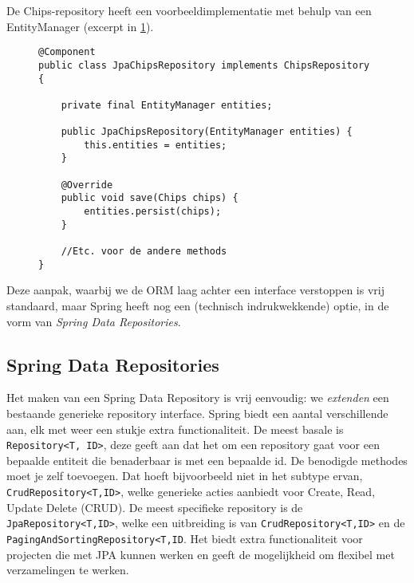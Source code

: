 De Chips-repository heeft een voorbeeldimplementatie met behulp van een EntityManager (excerpt in
\ref{pers:entitymanager}).

\begin{figure}
\begin{verbatim}
@Component
public class JpaChipsRepository implements ChipsRepository {

    private final EntityManager entities;

    public JpaChipsRepository(EntityManager entities) {
        this.entities = entities;
    }

    @Override
    public void save(Chips chips) {
        entities.persist(chips);
    }

    //Etc. voor de andere methods
}    
\end{verbatim}
\label{pers:entitymanager}
\end{figure}

Deze aanpak, waarbij we de ORM laag achter een interface verstoppen is vrij standaard, maar 
Spring heeft nog een (technisch indrukwekkende) optie, in de vorm van \textit{Spring Data Repositories}.

\subsection{Spring Data Repositories}

Het maken van een Spring Data Repository is vrij eenvoudig: we \textit{extenden} een bestaande 
generieke repository interface. Spring biedt een aantal verschillende aan, elk met 
weer een stukje extra functionaliteit. De meest basale is \texttt{Repository<T, ID>},
deze geeft aan dat het om een repository gaat voor een bepaalde entiteit die benaderbaar is 
met een bepaalde id. De benodigde methodes moet je zelf toevoegen. Dat hoeft bijvoorbeeld niet 
in het subtype ervan, \texttt{CrudRepository<T,ID>}, welke generieke acties aanbiedt voor
Create, Read, Update Delete (CRUD). De meest specifieke repository is de \texttt{JpaRepository<T,ID>},
welke een uitbreiding is van \texttt{CrudRepository<T,ID>} en de \texttt{PagingAndSortingRepository<T,ID}.
Het biedt extra functionaliteit voor projecten die met JPA kunnen werken
en geeft de mogelijkheid om flexibel met verzamelingen te werken.

